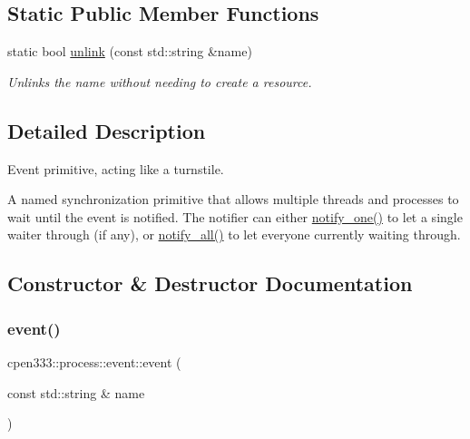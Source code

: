 \subsection*{Static Public Member Functions}
\begin{DoxyCompactItemize}
\item 
static bool \hyperlink{classcpen333_1_1process_1_1event_a5e013471e78e37c47036bd408987662a}{unlink} (const std\+::string \&name)
\begin{DoxyCompactList}\small\item\em Unlinks the name without needing to create a resource. \end{DoxyCompactList}\end{DoxyCompactItemize}


\subsection{Detailed Description}
Event primitive, acting like a turnstile. 

A named synchronization primitive that allows multiple threads and processes to wait until the event is notified. The notifier can either {\ttfamily \hyperlink{classcpen333_1_1process_1_1event_a47077325cc6cb29df3aba00de683ce42}{notify\+\_\+one()}} to let a single waiter through (if any), or {\ttfamily \hyperlink{classcpen333_1_1process_1_1event_a80184c9e2762fb1a0d7f3a9ff6ae27e7}{notify\+\_\+all()}} to let everyone currently waiting through. 

\subsection{Constructor \& Destructor Documentation}
\mbox{\label{classcpen333_1_1process_1_1event_a83253320779b5b9fd26b823608e69977}} 
\subsubsection{\texorpdfstring{event()}{event()}}
{\footnotesize\ttfamily cpen333\+::process\+::event\+::event (\begin{DoxyParamCaption}\item[{const std\+::string \&}]{name }\end{DoxyParamCaption})\hspace{0.3cm}{\ttfamily [inline]}}



